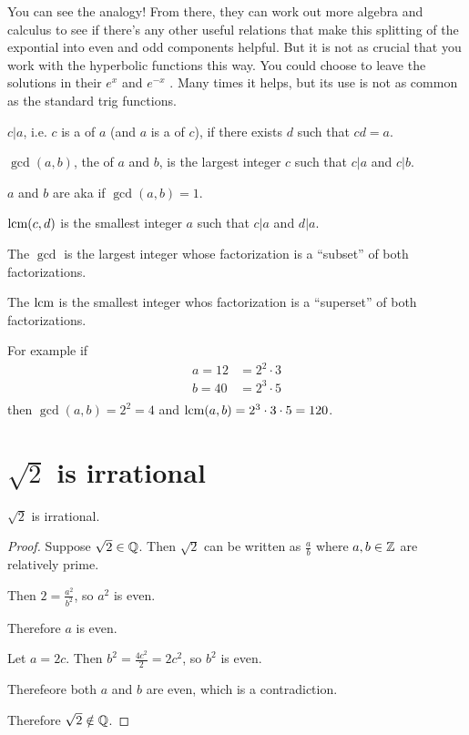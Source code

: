 You can see the analogy! From there, they can work out more algebra and calculus to see if there's
any other useful relations that make this splitting of the expontial into even and odd components
helpful. But it is not as crucial that you work with the hyperbolic functions this way. You could
choose to leave the solutions in their $e^{x}$ and $e^{-x}$ . Many times it helps, but its use is
not as common as the standard trig functions.


\begin{definition*}

 $c | a$, i.e. $c$ is a  of $a$ (and $a$ is a  of $c$), if there exists $d$ such that $cd = a$.

 $\gcd(a, b)$, the  of $a$ and $b$, is the largest integer $c$ such that $c | a$ and $c | b$.

  $a$ and $b$ are  aka  if $\gcd(a, b) = 1$.

  $\text{lcm}(c, d)$ is the smallest integer $a$ such that $c|a$ and $d|a$.
\end{definition*}

\begin{remark*}
  The $\gcd$ is the largest integer whose factorization is a ``subset​'' of both factorizations.

  The $\text{lcm}$ is the smallest integer whos factorization is a ``superset​'' of both factorizations.

  For example if
  \begin{align*}
    a = 12 &= 2^2 \cdot 3 \\
    b = 40 &= 2^3 \cdot 5 \\
  \end{align*}
  then $\gcd(a, b) = 2^2 = 4$ and $\text{lcm}(a, b) = 2^3 \cdot 3 \cdot 5 = 120$.

\end{remark*}


\section{$\sqrt{2}$ is irrational}
\begin{theorem*}
  $\sqrt{2}$ is irrational.
\end{theorem*}

\begin{proof}
  Suppose $\sqrt{2} \in \mathbb{Q}$. Then $\sqrt{2}$ can be written as $\frac{a}{b}$ where $a, b \in \mathbb{Z}$ are relatively prime.

  Then $2 = \frac{a^2}{b^2}$, so $a^2$ is even.

  Therefore $a$ is even.

  Let $a = 2c$. Then $b^2 = \frac{4c^2}{2} = 2c^2$, so $b^2$ is even.

  Therefeore both $a$ and $b$ are even, which is a contradiction.

  Therefore $\sqrt{2} \notin \mathbb{Q}$.
\end{proof}

